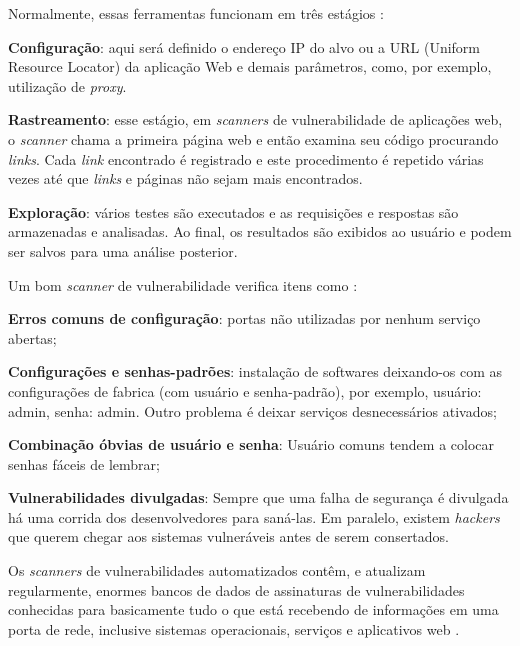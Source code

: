 Normalmente, essas ferramentas funcionam em três estágios \cite{avaliacao:tania}:

\begin{alineas}
 \item \textbf{Configuração}: aqui será definido o endereço IP do alvo ou a URL (Uniform Resource Locator) da aplicação Web e demais parâmetros, como, por exemplo, utilização de \textit{proxy}.
 \item \textbf{Rastreamento}: esse estágio, em \textit{scanners} de vulnerabilidade de aplicações web, o \textit{scanner} chama a primeira página web e então examina seu código procurando \textit{links}. Cada \textit{link} encontrado é registrado e este procedimento é repetido várias vezes até que \textit{links} e páginas não sejam mais encontrados.
 \item \textbf{Exploração}: vários testes são executados e as requisições e respostas são armazenadas e analisadas. Ao final, os resultados são exibidos ao usuário e podem ser salvos para uma análise posterior. 
\end{alineas}

Um bom \textit{scanner} de vulnerabilidade verifica itens como \cite{univhacker}: 

\begin{alineas}
\item \textbf{Erros comuns de configuração}: portas não utilizadas por nenhum serviço abertas;
\item \textbf{Configurações e senhas-padrões}: instalação de softwares deixando-os com as configurações de fabrica (com usuário e senha-padrão), por exemplo, usuário: admin, senha: admin. Outro problema é deixar serviços desnecessários ativados;
\item \textbf{Combinação óbvias de usuário e senha}: Usuário comuns tendem a colocar senhas fáceis de lembrar;
\item \textbf{Vulnerabilidades divulgadas}: Sempre que uma falha de segurança é divulgada há uma corrida dos desenvolvedores para saná-las. Em paralelo, existem \textit{hackers} que querem chegar aos sistemas vulneráveis antes de serem consertados.
\end{alineas}

Os \textit{scanners} de vulnerabilidades automatizados contêm, e atualizam regularmente, enormes bancos de dados de assinaturas de vulnerabilidades conhecidas para basicamente tudo o que está recebendo de informações em uma porta de rede, inclusive sistemas operacionais, serviços e aplicativos web \cite{hackers:stuart-joel}. 

